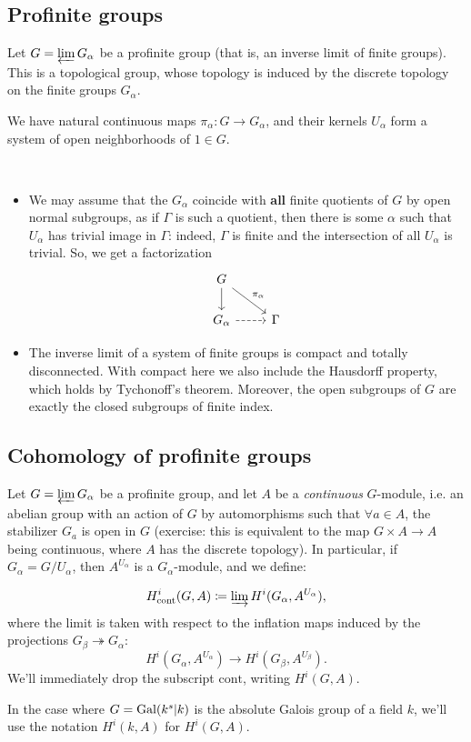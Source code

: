 \documentclass{article}
\begin{document}

\subsection{Profinite groups}

Let $G=\varprojlim G_\alpha$ be a profinite group (that is, an inverse limit of finite groups). This is a topological group, whose topology is induced by the discrete topology on the finite groups $G_\alpha$. 

We have natural continuous maps $\pi_\alpha:G\to G_\alpha$, and their kernels $U_\alpha$ form a system of open neighborhoods of $1\in G$.

\begin{rmk}\
	\begin{itemize}
			\item We may assume that the $G_\alpha$ coincide with \textbf{all} finite quotients of $G$ by open normal subgroups, as if $\Gamma$ is such a quotient, then there is some $\alpha$ such that $U_\alpha$ has trivial image in $\Gamma$: indeed, $\Gamma$ is finite and the intersection of all $U_\alpha$ is trivial. So, we get a factorization
		\[
		\begin{tikzcd}
			G \arrow[rd, "\pi_\alpha"] \arrow[d] &   \\
			G_\alpha \arrow[r, dashed]                     & \Gamma
		\end{tikzcd}
		\]
		\item The inverse limit of a system of finite groups is compact and totally disconnected. With compact here we also include the Hausdorff property, which holds by Tychonoff's theorem. Moreover, the open subgroups of $G$ are exactly the closed subgroups of finite index.
	\end{itemize}	
\end{rmk}
\subsection{Cohomology of profinite groups}
Let $G=\varprojlim G_\alpha$ be a profinite group, and let $A$ be a \textit{continuous} $G$-module, i.e. an abelian group with an action of $G$ by automorphisms such that $\forall a\in A$, the stabilizer $G_a$ is open in $G$ (exercise: this is equivalent to the map $G\times A\to A$ being continuous, where $A$ has the discrete topology). In particular, if $G_\alpha=G/U_\alpha$, then $A^{U_\alpha}$ is a $G_\alpha$-module, and we define:
\begin{defn}
	\[
		H^i_{\text{cont}}(G,A) \coloneqq \varinjlim H^i(G_\alpha,A^{U_\alpha}),
	\]
	where the limit is taken with respect to the inflation maps induced by the projections $G_\beta\twoheadrightarrow G_\alpha$:
	\[
		H^i(G_\alpha,A^{U_\alpha}) \to H^i(G_\beta,A^{U_\beta}).
	\]
	We'll immediately drop the subscript $\text{cont}$, writing $H^i(G,A)$.
\end{defn}
In the case where $G=\operatorname{Gal}(k^s|k)$ is the absolute Galois group of a field $k$, we'll use the notation $H^i(k,A)$ for $H^i(G,A)$.
\end{document}
